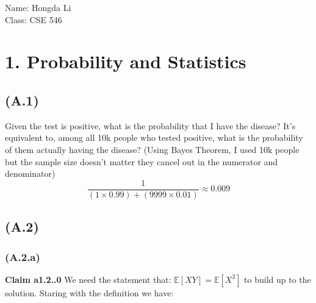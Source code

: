\documentclass[]{article}
\begin{document}
\hspace{-1.8em}
Name: Hongda Li
\\
Class: CSE 546
\section*{1. Probability and Statistics}
    \subsection*{(A.1)}
        Given the test is positive, what is the probability that I have the disease? It's equivalent to, among all 10k people who tested positive, what is the probability of them actually having the disease? (Using Bayes Theorem, I used 10k people but the sample size doesn't matter they cancel out in the numerator and denominator)
        $$
        \frac{1}{(1\times 0.99) + (9999\times 0.01)} \approx 0.009
        $$
    \subsection*{(A.2)}
        \subsubsection*{(A.2.a)}
            \textbf{Claim a1.2..0} We need the statement that: $\mathbb{E}\left[XY\right] = \mathbb{E}\left[X^2\right]$ to build up to the solution. Staring with the definition we have: 
\end{document}
